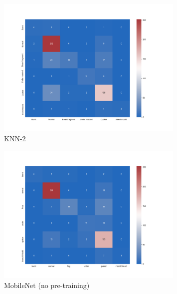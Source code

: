 \begin{figure}[!ht]
    \centering
    \includegraphics[width=0.8\textwidth]{figures/confusionMatrices/KNN-2}
    \caption[KNN-2]{\hyperref[tab:knnResults]{KNN-2}}
    \label{fig:knn-2}
\end{figure}

\begin{figure}[!ht]
    \centering
    \includegraphics[width=0.8\textwidth]{figures/confusionMatrices/mobileNet-no-pretraining0-5gamma}
    \caption{MobileNet (no pre-training)}
    \label{fig:mobileNetNoPt}
\end{figure}


